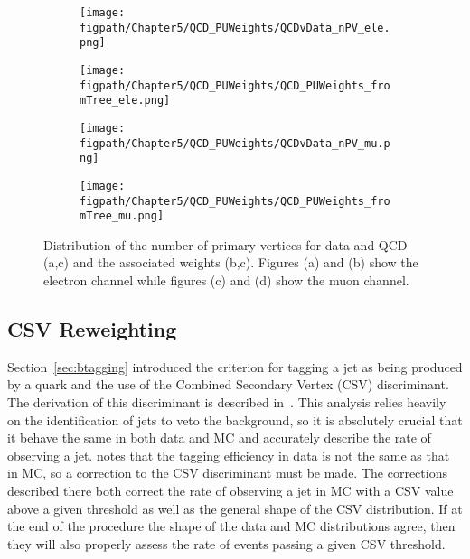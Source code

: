 \begin{figure}[!hbt]
    \centering
    \begin{subfigure}[t]{0.48\textwidth}
        \texttt{[image: \\figpath/Chapter5/QCD\_PUWeights/QCDvData\_nPV\_ele.png]}
        \caption{}
        \label{fig:QCDvData_nPV_ele}
    \end{subfigure}
    \begin{subfigure}[t]{0.48\textwidth}
        \texttt{[image: \\figpath/Chapter5/QCD\_PUWeights/QCD\_PUWeights\_fromTree\_ele.png]}
        \caption{}
        \label{fig:QCD_PUWeights_ele}
    \end{subfigure}

    \begin{subfigure}[t]{0.48\textwidth}
        \texttt{[image: \\figpath/Chapter5/QCD\_PUWeights/QCDvData\_nPV\_mu.png]}
        \caption{}
        \label{fig:QCDvData_nPV_mu}
    \end{subfigure}
    \begin{subfigure}[t]{0.48\textwidth}
        \texttt{[image: \\figpath/Chapter5/QCD\_PUWeights/QCD\_PUWeights\_fromTree\_mu.png]}
        \caption{}
        \label{fig:QCD_PUWeights_mu}
    \end{subfigure}
    \caption{Distribution of the number of primary vertices for data and QCD (a,c) and the associated weights (b,c). Figures (a) and (b) show the electron channel while figures (c) and (d) show the muon channel.}
    \label{fig:QCD_PUReweight}
\end{figure}

\subsection{CSV Reweighting}
Section~\ref{sec:btagging} introduced the criterion for tagging a jet as being produced by a \cPqb quark and the use of the Combined Secondary Vertex (CSV) discriminant.
The derivation of this discriminant is described in~\cite{Weiser:927399,BTV-12-001}.
This analysis relies heavily on the identification of \cPqb jets to veto the \ttbar background, so it is absolutely crucial that it behave the same in both data and MC and accurately describe the rate of observing a \cPqb jet.
\cite{CMS-AN-13-130} notes that the tagging efficiency in data is not the same as that in MC, so a correction to the CSV discriminant must be made.
The corrections described there both correct the rate of observing a jet in MC with a CSV value above a given threshold as well as the general shape of the CSV distribution.
If at the end of the procedure the shape of the data and MC distributions agree, then they will also properly assess the rate of events passing a given CSV threshold.

